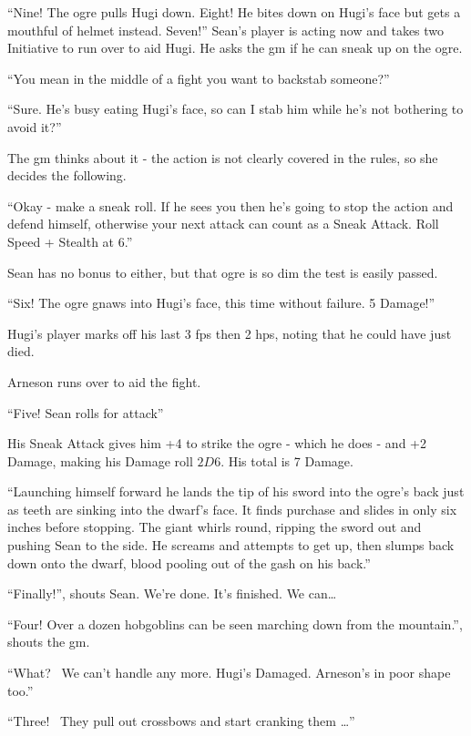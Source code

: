 \begin{exampletext}
``Nine! The ogre pulls Hugi down. Eight! He bites down on Hugi's face but gets a mouthful of helmet instead. Seven!''
Sean's player is acting now and takes two Initiative to run over to aid Hugi.
He asks the \gls{gm} if he can sneak up on the ogre.

``You mean in the middle of a fight you want to backstab someone?''

``Sure. He's busy eating Hugi's face, so can I stab him while he's not bothering to avoid it?''

The \gls{gm} thinks about it - the action is not clearly covered in the rules, so she decides the following.

``Okay - make a sneak roll.
If he sees you then he's going to stop the action and defend himself, otherwise your next attack can count as a Sneak Attack. Roll Speed + Stealth at  6.''

Sean has no bonus to either, but that ogre is so dim the test is easily passed. 

``Six! The ogre gnaws into Hugi's face, this time without failure. 5 Damage!''

Hugi's player marks off his last 3 \glspl{fp} then 2 \glspl{hp}, noting that he could have just died.

Arneson runs over to aid the fight.

``Five! Sean rolls for attack''

His Sneak Attack gives him +4 to strike the ogre - which he does - and +2 Damage, making his Damage roll $2D6$. His total is 7 Damage.

``Launching himself forward he lands the tip of his sword into the ogre's back just as teeth are sinking into the dwarf's face.
It finds purchase and slides in only six inches before stopping.
The giant whirls \gls{round}, ripping the sword out and pushing Sean to the side.
He screams and attempts to get up, then slumps back down onto the dwarf, blood pooling out of the gash on his back.''

``Finally!'', shouts Sean.
We're done.
It's finished.
We can\ldots

``Four! Over a dozen hobgoblins can be seen marching down from the mountain.'', shouts the \gls{gm}.

``What? \ We can't handle any more. Hugi's Damaged. Arneson's in poor shape too.''

``Three! \ They pull out crossbows and start cranking them {\dots}''

\end{exampletext}
